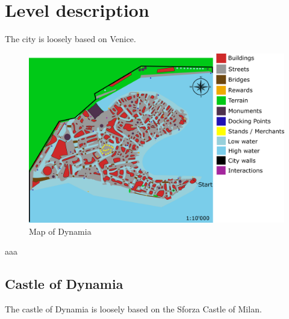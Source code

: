 \section{Level description}

The city is loosely based on Venice.

\begin{center}
  \begin{figure}[H]
    \centering
    \includegraphics[width=\textwidth]{Images/Maps/dynamia}
    \caption{Map of Dynamia}
  \end{figure}
\end{center}

aaa

\pagebreak

\subsection{Castle of Dynamia}
The castle of Dynamia is loosely based on the Sforza Castle of Milan.

